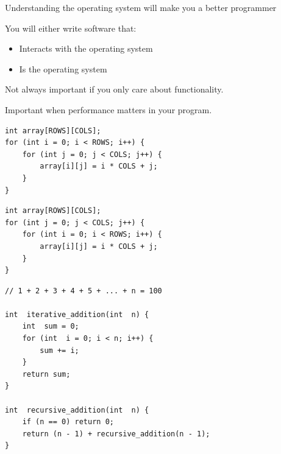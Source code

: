 \begin{slide}
  

    Understanding the operating system will make you a better programmer
    \bigskip

    You will either write software that:
    \begin{itemize}
        \item Interacts with the operating system
        \item Is the operating system
    \end{itemize}
  
    \bigskip
    
    Not always important if you only care about functionality.
    \medskip
    
    Important when performance matters in your program.
    
\end{slide}

\begin{slide}

    
    \begin{verbatim}
int array[ROWS][COLS];
for (int i = 0; i < ROWS; i++) {
    for (int j = 0; j < COLS; j++) {
        array[i][j] = i * COLS + j;
    }
}
    \end{verbatim}   
	
	\bigskip
	
	\begin{verbatim}
int array[ROWS][COLS];
for (int j = 0; j < COLS; j++) {
    for (int i = 0; i < ROWS; i++) {
        array[i][j] = i * COLS + j;
    }
}
	\end{verbatim}    
    
\end{slide}

\begin{slide}


\begin{verbatim}
// 1 + 2 + 3 + 4 + 5 + ... + n = 100

int  iterative_addition(int  n) {
    int  sum = 0;
    for (int  i = 0; i < n; i++) {
        sum += i;
    }
    return sum;
}

int  recursive_addition(int  n) {
    if (n == 0) return 0;
    return (n - 1) + recursive_addition(n - 1);
}
\end{verbatim}
    
\end{slide}

